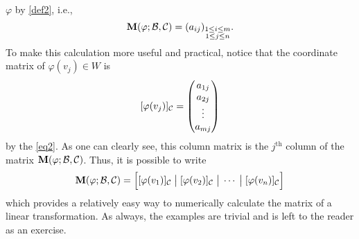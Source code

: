 $\varphi$ by \cref{def2}, i.e.,
%
\[
    \mathbf{M}(\varphi; \mathcal{B}, \mathcal{C}) = (a_{ij})_{\substack{1 \leq i \leq m \\ 1 \leq j \leq n}}.
\]
%
To make this calculation more useful and practical, notice that the coordinate
matrix of $\varphi(v_{j}) \in W$ is
%
\[
    [\varphi(v_{j})]_{\mathcal{C}} = \begin{pmatrix}
                                    a_{1j} \\
                                    a_{2j} \\
                                    \vdots \\
                                    a_{mj}
                                \end{pmatrix}
\]
%
by the \cref{eq2}. As one can clearly see, this column matrix is the
$j^{\text{th}}$ column of the matrix $\mathbf{M}(\varphi; \mathcal{B}, \mathcal{C})$. Thus, it is possible
to write
%
\[
    \mathbf{M}(\varphi; \mathcal{B}, \mathcal{C}) = \Big[[\varphi(v_{1})]_{\mathcal{C}} 
    \; \big|
    \; [\varphi(v_{2})]_{\mathcal{C}} \; \big| 
    \; \cdots \; \big| 
    \; [\varphi(v_{n})]_{\mathcal{C}}\Big]
\]
%
which provides a relatively easy way to numerically calculate the matrix
of a linear transformation. As always, the examples are trivial and is left
to the reader as an exercise.

